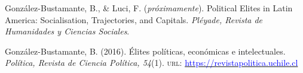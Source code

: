 





\begin{publications}

\begin{benumerate}{2}
\item{\small Gonz\'alez-Bustamante, B., \& Luci, F. ({\itshape próximamente}). Political Elites in Latin America: Socialisation, Trajectories, and Capitals. {\itshape Pléyade, Revista de Humanidades y Ciencias Sociales}.}\vspace{1mm}

\item{\small Gonz\'alez-Bustamante, B. (2016). Élites políticas, económicas e intelectuales. {\itshape Pol\'itica, Revista de Ciencia Pol\'itica, 54}(1). {\scshape url}: \href{https://revistapolitica.uchile.cl/index.php/RP/issue/view/4365}{\textcolor{blue}{https://revistapolitica.uchile.cl}}} \vspace{1mm}
\end{benumerate}

\end{publications}
